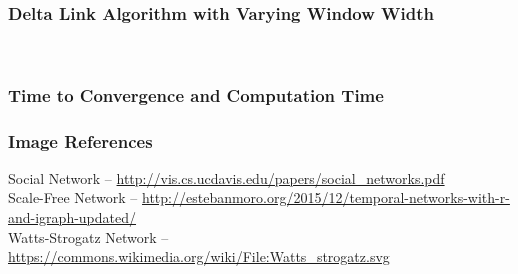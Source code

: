 \documentclass[11pt]{beamer}
\begin{document}
\begin{frame}
\frametitle{Delta Link Algorithm with Varying Window Width}
\begin{figure}
    \begin{subfigure}{.4\textwidth}
        \centering
        \label{window2nohit}
    \end{subfigure} %
    \begin{subfigure}{.4\textwidth}
        \centering
        \label{window3nohit}
    \end{subfigure}\\%
    \begin{subfigure}{.4\textwidth}
        \centering
        \label{window10nohit}
    \end{subfigure} %
    \begin{subfigure}{.4\textwidth}
        \centering

        \label{window20nohit}
    \end{subfigure} 

\end{figure}
\end{frame}

\begin{frame}

\frametitle{Time to Convergence and Computation Time}
\begin{figure}
    \centering
\end{figure}
\end{frame}

\begin{frame}
\frametitle{Image References}
Social Network -- \url{http://vis.cs.ucdavis.edu/papers/social_networks.pdf}\\
Scale-Free Network -- \url{http://estebanmoro.org/2015/12/temporal-networks-with-r-and-igraph-updated/}\\
Watts-Strogatz Network -- \url{https://commons.wikimedia.org/wiki/File:Watts_strogatz.svg}\\
\end{frame}
\end{document}
